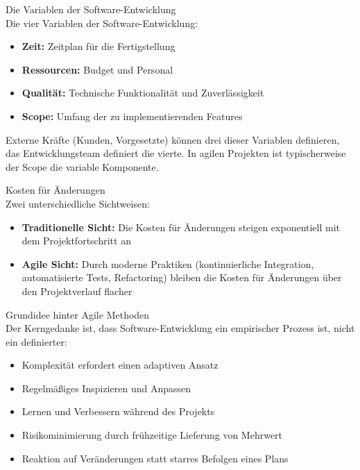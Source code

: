 \begin{concept}{Die Variablen der Software-Entwicklung}\\
    Die vier Variablen der Software-Entwicklung:
    \begin{itemize}
        \item \textbf{Zeit:} Zeitplan für die Fertigstellung
        \item \textbf{Ressourcen:} Budget und Personal
        \item \textbf{Qualität:} Technische Funktionalität und Zuverlässigkeit
        \item \textbf{Scope:} Umfang der zu implementierenden Features
    \end{itemize}
    Externe Kräfte (Kunden, Vorgesetzte) können drei dieser Variablen definieren, das Entwicklungsteam definiert die vierte. In agilen Projekten ist typischerweise der Scope die variable Komponente.
\end{concept}

\begin{concept}{Kosten für Änderungen}\\
    Zwei unterschiedliche Sichtweisen:
    \begin{itemize}
        \item \textbf{Traditionelle Sicht:} Die Kosten für Änderungen steigen exponentiell mit dem Projektfortschritt an
        \item \textbf{Agile Sicht:} Durch moderne Praktiken (kontinuierliche Integration, automatisierte Tests, Refactoring) bleiben die Kosten für Änderungen über den Projektverlauf flacher
    \end{itemize}
\end{concept}

\begin{concept}{Grundidee hinter Agile Methoden}\\
    Der Kerngedanke ist, dass Software-Entwicklung ein empirischer Prozess ist, nicht ein definierter:
    \begin{itemize}
        \item Komplexität erfordert einen adaptiven Ansatz
        \item Regelmäßiges Inspizieren und Anpassen
        \item Lernen und Verbessern während des Projekts
        \item Risikominimierung durch frühzeitige Lieferung von Mehrwert
        \item Reaktion auf Veränderungen statt starres Befolgen eines Plans
    \end{itemize}
\end{concept}

